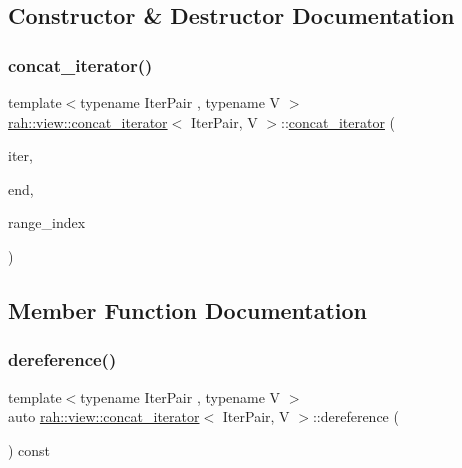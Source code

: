 \subsection{Constructor \& Destructor Documentation}
\mbox{\label{structrah_1_1view_1_1concat__iterator_a45e7ea9b72e7df5390a2ae09a6923d11}} 
\subsubsection{\texorpdfstring{concat\_iterator()}{concat\_iterator()}}
{\footnotesize\ttfamily template$<$typename Iter\+Pair , typename V $>$ \\
\mbox{\hyperlink{structrah_1_1view_1_1concat__iterator}{rah\+::view\+::concat\+\_\+iterator}}$<$ Iter\+Pair, V $>$\+::\mbox{\hyperlink{structrah_1_1view_1_1concat__iterator}{concat\+\_\+iterator}} (\begin{DoxyParamCaption}\item[{Iter\+Pair const \&}]{iter,  }\item[{Iter\+Pair const \&}]{end,  }\item[{size\+\_\+t}]{range\+\_\+index }\end{DoxyParamCaption})\hspace{0.3cm}{\ttfamily [inline]}}



\subsection{Member Function Documentation}
\mbox{\label{structrah_1_1view_1_1concat__iterator_af36beb1e5fbf0614bf42483c582a0e64}} 
\subsubsection{\texorpdfstring{dereference()}{dereference()}}
{\footnotesize\ttfamily template$<$typename Iter\+Pair , typename V $>$ \\
auto \mbox{\hyperlink{structrah_1_1view_1_1concat__iterator}{rah\+::view\+::concat\+\_\+iterator}}$<$ Iter\+Pair, V $>$\+::dereference (\begin{DoxyParamCaption}{ }\end{DoxyParamCaption}) const\hspace{0.3cm}{\ttfamily [inline]}}


